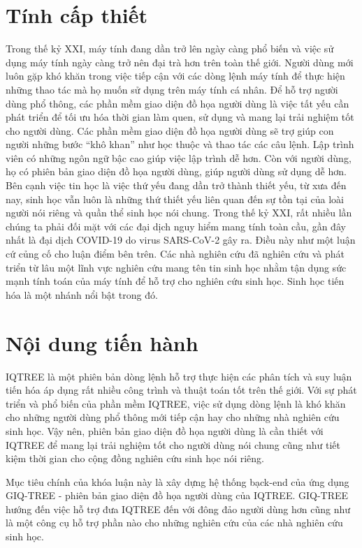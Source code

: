 \documentclass[12pt]{report}
\begin{document}
\section{Tính cấp thiết}
Trong thế kỷ XXI, máy tính đang dần trở lên ngày càng phổ biến và việc sử dụng máy tính ngày càng trở nên đại trà hơn trên toàn thế giới. Người dùng mới luôn gặp khó khăn trong việc tiếp cận với các dòng lệnh máy tính để thực hiện những thao tác mà họ muốn sử dụng trên máy tính cá nhân. Để hỗ trợ người dùng phổ thông, các phần mềm giao diện đồ họa người dùng là việc tất yếu cần phát triển để tối ưu hóa thời gian làm quen, sử dụng và mang lại trải nghiệm tốt cho người dùng. Các phần mềm giao diện đồ họa người dùng sẽ trợ giúp con người những bước “khô khan” như học thuộc và thao tác các câu lệnh. 
Lập trình viên có những ngôn ngữ bậc cao giúp việc lập trình dễ hơn. Còn với người dùng, họ có phiên bản giao diện đồ họa người dùng, giúp người dùng sử dụng dễ hơn.
Bên cạnh việc tin học là việc thứ yếu đang dần trở thành thiết yếu, từ xưa đến nay, sinh học vẫn luôn là những thứ thiết yếu liên quan đến sự tồn tại của loài người nói riêng và quần thể sinh học nói chung. Trong thế kỷ XXI, rất nhiều lần chúng ta phải đối mặt với các đại dịch nguy hiểm mang tính toàn cầu, gần đây nhất là đại dịch COVID-19 do virus SARS-CoV-2 gây ra. Điều này như một luận cứ củng cố cho luận điểm bên trên. Các nhà nghiên cứu đã nghiên cứu và phát triển từ lâu một lĩnh vực nghiên cứu mang tên tin sinh học nhằm tận dụng sức mạnh tính toán của máy tính để hỗ trợ cho nghiên cứu sinh học. Sinh học tiến hóa là một nhánh nổi bật trong đó.

\section{Nội dung tiến hành}
IQTREE là một phiên bản dòng lệnh hỗ trợ thực hiện các phân tích và suy luận tiến hóa áp dụng rất nhiều công trình và thuật toán tốt trên thế giới. Với sự phát triển và phổ biến của phần mềm IQTREE, việc sử dụng dòng lệnh là khó khăn cho những người dùng phổ thông mới tiếp cận hay cho những nhà nghiên cứu sinh học. Vậy nên, phiên bản giao diện đồ họa người dùng là cần thiết với IQTREE để mang lại trải nghiệm tốt cho người dùng nói chung cũng như tiết kiệm thời gian cho cộng đồng nghiên cứu sinh học nói riêng.

Mục tiêu chính của khóa luận này là xây dựng hệ thống bạck-end của ứng dụng GIQ-TREE - phiên bản giao diện đồ họa người dùng của IQTREE. GIQ-TREE hướng đến việc hỗ trợ đưa IQTREE đến với đông đảo người dùng hơn cũng như là một công cụ hỗ trợ phần nào cho những nghiên cứu của các nhà nghiên cứu sinh học.
\end{document}
